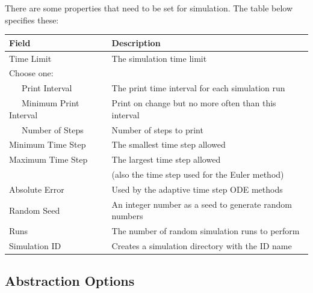 \documentclass[titlepage,11pt]{article}
\begin{document}
There are some properties that need to be set for simulation.
The table below specifies these:

\begin{center}
\begin{tabular}{|l|l|}
\hline
Field             & Description \\ \hline \hline
Time Limit        & The simulation time limit \\ \hline
Choose one:    &  \\ \hline
~~~Print Interval    & The print time interval for each simulation run \\ \hline 
~~~Minimum Print Interval    & Print on change but no more often than this interval \\ \hline  
~~~Number of Steps    & Number of steps to print \\ \hline  
Minimum Time Step & The smallest time step allowed \\ \hline
Maximum Time Step & The largest time step allowed \\ 
      ~           & (also the time step used for the Euler method) \\ \hline
Absolute Error    & Used by the adaptive time step ODE methods \\ \hline
Random Seed       & An integer number as a seed to generate random numbers \\ \hline
Runs              & The number of random simulation runs to perform \\ \hline
Simulation ID     & Creates a simulation directory with the ID name \\ \hline
\end{tabular}
\end{center}

\subsection{\label{absOptions}Abstraction Options}
\end{document}
